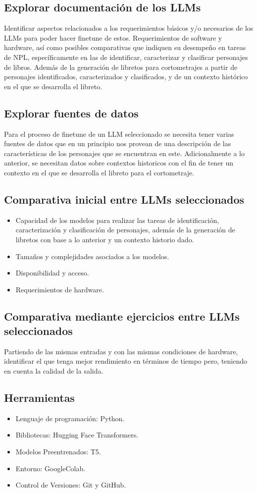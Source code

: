 \documentclass[journal,onecolumn]{IEEEtran}
\begin{document}
	\subsection{Explorar documentación de los LLMs}
	Identificar aspectos relacionados a los requerimientos básicos y/o necesarios de los LLMs para poder hacer finetune de estos. Requerimientos de software y hardware, así como posibles comparativas que indiquen su desempeño en tareas de NPL, específicamente en las de identificar, caracterizar y clasificar personajes de libros. Además de la generación de libretos para cortometrajes a partir de personajes identificados, caracterizados y clasificados, y de un contexto histórico en el que se desarrolla el libreto.
	\subsection{Explorar fuentes de datos}
	Para el proceso de finetune de un LLM seleccionado se necesita tener varias fuentes de datos que en un principio nos provean de una descripción de las características de los personajes que se encuentran en este. Adicionalmente a lo anterior, se necesitan datos sobre contextos historicos con el fin de tener un contexto en el que se desarrolla el libreto para el cortometraje.
	\subsection{Comparativa inicial entre LLMs seleccionados}
	\begin{itemize}
		\item Capacidad de los modelos para realizar las tareas de identificación, caracterización y clasificación de personajes, además de la generación de libretos con base a lo anterior y un contexto historio dado.
		\item Tamaños y complejidades asociados a los modelos.
		\item Disponibilidad y acceso.
		\item Requerimientos de hardware.
	\end{itemize}
	\subsection{Comparativa mediante ejercicios entre LLMs seleccionados}
	Partiendo de las mismas entradas y con las mismas condiciones de hardware, identificar el que tenga mejor rendimiento en términos de tiempo pero, teniendo en cuenta la calidad de la salida.
	\subsection{Herramientas}
	\begin{itemize}
		\item Lenguaje de programación: Python.
		\item Bibliotecas: Hugging Face Transformers.
		\item Modelos Preentrenados: T5.
		\item Entorno: GoogleColab.
		\item Control de Versiones: Git y GitHub.
	\end{itemize}
	
\end{document}
